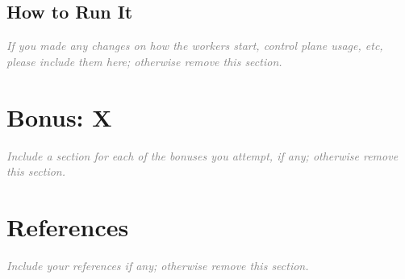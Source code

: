 \documentclass[a4paper,11pt]{article}
\newcommand{\note}[1]{\textit{\textcolor{gray}{#1}}}
\begin{document}
\subsection{How to Run It}

\note{If you made any changes on how the workers start, control plane usage, etc, please include them here; otherwise remove this section.}

\section{Bonus: X}

\note{Include a section for each of the bonuses you attempt, if any; otherwise remove this section.}


\section{References}

\note{Include your references if any; otherwise remove this section.}
\end{document}
